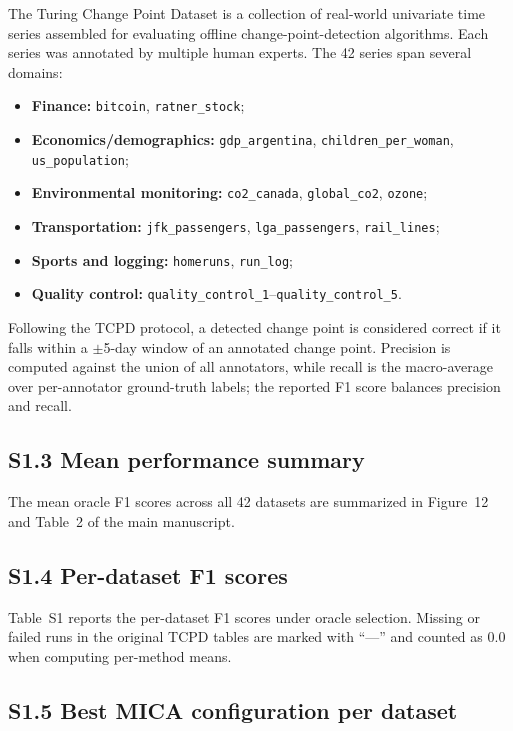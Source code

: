 \documentclass[11pt,a4paper]{article}
\begin{document}
The Turing Change Point Dataset \cite{vandenburg2020evaluation} is a collection of real-world univariate time series assembled for evaluating offline change-point-detection algorithms. Each series was annotated by multiple human experts. The 42 series span several domains:
\begin{itemize}
    \item \textbf{Finance:} \texttt{bitcoin}, \texttt{ratner\_stock};
    \item \textbf{Economics/demographics:} \texttt{gdp\_argentina}, \texttt{children\_per\_woman}, \allowbreak \texttt{us\_population};
    \item \textbf{Environmental monitoring:} \texttt{co2\_canada}, \texttt{global\_co2}, \texttt{ozone};
    \item \textbf{Transportation:} \texttt{jfk\_passengers}, \texttt{lga\_passengers}, \texttt{rail\_lines};
    \item \textbf{Sports and logging:} \texttt{homeruns}, \texttt{run\_log};
    \item \textbf{Quality control:} \texttt{quality\_control\_1}--\texttt{quality\_control\_5}.
\end{itemize}

Following the TCPD protocol, a detected change point is considered correct if it falls within a $\pm$5-day window of an annotated change point. Precision is computed against the union of all annotators, while recall is the macro-average over per-annotator ground-truth labels; the reported F1 score balances precision and recall.

\subsection*{S1.3 Mean performance summary}

The mean oracle F1 scores across all 42 datasets are summarized in Figure~12 and Table~2 of the main manuscript.

\subsection*{S1.4 Per-dataset F1 scores}

Table~S1 reports the per-dataset F1 scores under oracle selection. Missing or failed runs in the original TCPD tables are marked with ``---'' and counted as 0.0 when computing per-method means.

\subsection*{S1.5 Best MICA configuration per dataset}
\end{document}

